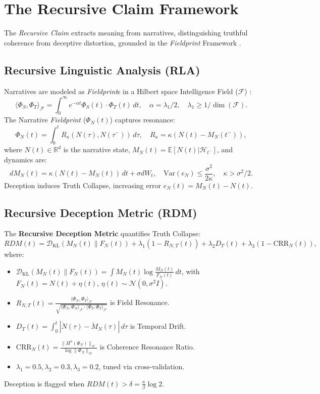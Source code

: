 \documentclass[11pt]{article}
\newcommand{\fieldprint}{\textit{Fieldprint}}
\newcommand{\recursiveclaim}{\textit{Recursive Claim}}
\newcommand{\rdm}{\textbf{Recursive Deception Metric}}
\begin{document}
\section{The Recursive Claim Framework}
\label{sec:framework}
The \recursiveclaim{} extracts meaning from narratives, distinguishing truthful coherence from deceptive distortion, grounded in the \fieldprint{} Framework \citep{havens2025b}.

\subsection{Recursive Linguistic Analysis (RLA)}
\label{subsec:rla}
Narratives are modeled as \fieldprint{}s in a Hilbert space Intelligence Field (\(\mathcal{F}\)) \citep{havens2025b}:
\[
\langle \Phi_S, \Phi_T \rangle_\mathcal{F} = \int_0^\infty e^{-\alpha t} \Phi_S(t) \cdot \Phi_T(t) \, dt, \quad \alpha = \lambda_1 / 2, \quad \lambda_1 \geq 1 / \dim(\mathcal{F}).
\]
The Narrative \fieldprint{} (\(\Phi_N(t)\)) captures resonance:
\[
\Phi_N(t) = \int_0^t R_\kappa(N(\tau), N(\tau^-)) \, d\tau, \quad R_\kappa = \kappa (N(t) - M_N(t^-)),
\]
where \(N(t) \in \mathbb{R}^d\) is the narrative state, \(M_N(t) = \mathbb{E}[N(t) | \mathcal{H}_{t^-}]\), and dynamics are:
\[
d M_N(t) = \kappa (N(t) - M_N(t)) \, dt + \sigma d W_t, \quad \text{Var}(e_N) \leq \frac{\sigma^2}{2\kappa}, \quad \kappa > \sigma^2 / 2.
\]
Deception induces Truth Collapse, increasing error \(e_N(t) = M_N(t) - N(t)\).

\subsection{Recursive Deception Metric (RDM)}
\label{subsec:rdm}
The \rdm{} quantifies Truth Collapse:
\[
RDM(t) = \mathcal{D}_{\text{KL}}(M_N(t) \| F_N(t)) + \lambda_1 (1 - R_{N,T}(t)) + \lambda_2 D_T(t) + \lambda_3 (1 - \text{CRR}_N(t)),
\]
where:
\begin{itemize}
    \item \(\mathcal{D}_{\text{KL}}(M_N(t) \| F_N(t)) = \int M_N(t) \log \frac{M_N(t)}{F_N(t)} \, dt\), with \(F_N(t) = N(t) + \eta(t)\), \(\eta(t) \sim \mathcal{N}(0, \sigma^2 I)\).
    \item \(R_{N,T}(t) = \frac{\langle \Phi_N, \Phi_T \rangle_\mathcal{F}}{\sqrt{\langle \Phi_N, \Phi_N \rangle_\mathcal{F} \cdot \langle \Phi_T, \Phi_T \rangle_\mathcal{F}}}\) is Field Resonance.
    \item \(D_T(t) = \int_0^t | \dot{N}(\tau) - \dot{M}_N(\tau) | \, d\tau\) is Temporal Drift.
    \item \(\text{CRR}_N(t) = \frac{\| H^n(\Phi_N) \|_\mathcal{H}}{\log \|\Phi_N\|_\mathcal{H}}\) is Coherence Resonance Ratio.
    \item \(\lambda_1 = 0.5, \lambda_2 = 0.3, \lambda_3 = 0.2\), tuned via cross-validation.
\end{itemize}
Deception is flagged when \(RDM(t) > \delta = \frac{\kappa}{\beta} \log 2\).
\end{document}
